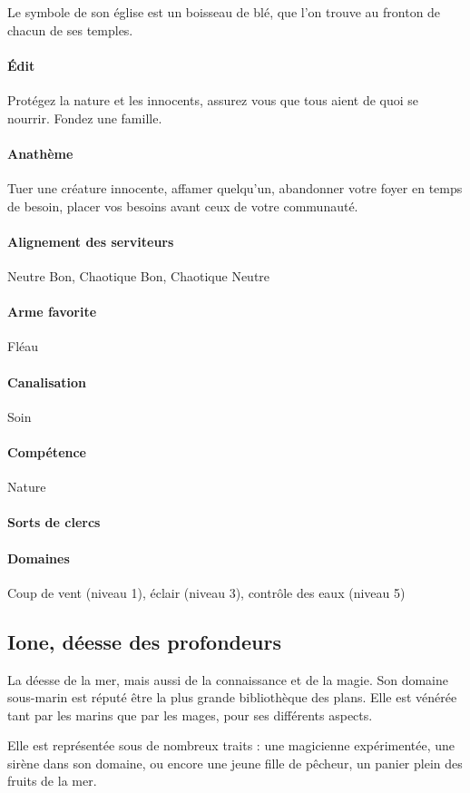 \documentclass[10pt,a4paper]{book}
\begin{document}
Le symbole de son église est un boisseau de blé, que l'on trouve au fronton de chacun de ses temples.
\paragraph{Édit} Protégez la nature et les innocents, assurez vous que tous aient de quoi se nourrir. Fondez une famille.
\paragraph{Anathème} Tuer une créature innocente, affamer quelqu'un, abandonner votre foyer en temps de besoin, placer vos besoins avant ceux de votre communauté.
\paragraph{Alignement des serviteurs} Neutre Bon, Chaotique Bon, Chaotique Neutre
\paragraph{Arme favorite } Fléau
\paragraph{Canalisation} Soin
\paragraph{Compétence} Nature
\paragraph{Sorts de clercs} 
\paragraph{Domaines }Coup de vent (niveau 1), éclair (niveau 3), contrôle des eaux (niveau 5)
\subsection{Ione, déesse des profondeurs}
La déesse de la mer, mais aussi de la connaissance et de la magie. Son domaine sous-marin est réputé être la plus grande bibliothèque des plans. Elle est vénérée tant par les marins que par les mages, pour ses différents aspects.

Elle est représentée sous de nombreux traits : une magicienne expérimentée, une sirène dans son domaine, ou encore une jeune fille de pêcheur, un panier plein des fruits de la mer.
\end{document}
